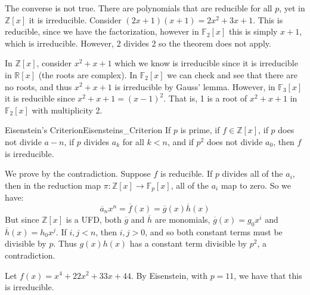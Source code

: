 \documentclass{article}                                                        %
\begin{document}
            \begin{example}
                The converse is not true. There are polynomials that are
                reducible for all $p$, yet in $\mathbb{Z}[x]$ it is irreducible.
                Consider $(2x+1)(x+1)=2x^{2}+3x+1$. This is reducible, since
                we have the factorization, however in $\mathbb{F}_{2}[x]$ this
                is simply $x+1$, which is irreducible. However, 2 divides 2 so
                the theorem does not apply.
            \end{example}
            \begin{example}
                In $\mathbb{Z}[x]$, consider $x^{2}+x+1$ which we know is
                irreducible since it is irreducible in $\mathbb{R}[x]$
                (the roots are complex). In $\mathbb{F}_{2}[x]$ we can check and
                see that there are no roots, and thus $x^{2}+x+1$ is irreducible
                by Gauss' lemma. However, in $\mathbb{F}_{3}[x]$ it is reducible
                since $x^{2}+x+1=(x-1)^{2}$. That is, 1 is a root of $x^{2}+x+1$
                in $\mathbb{F}_{2}[x]$ with multiplicity 2.
            \end{example}
            \begin{ftheorem}{Eisenstein's Criterion}{Eisensteins_Criterion}
                If $p$ is prime, if $f\in\mathbb{Z}[x]$, if $p$ does not divide
                $a-{n}$, if $p$ divides $a_{k}$ for all $k<n$, and if
                $p^{2}$ does not divide $a_{0}$, then $f$ is irreducible.
            \end{ftheorem}
            \begin{bproof}
                We prove by the contradiction. Suppose $f$ is reducible.
                If $p$ divides all of the $a_{i}$, then in the reduction map
                $\pi:\mathbb{Z}[x]\rightarrow\mathbb{F}_{p}[x]$, all of the
                $a_{i}$ map to zero. So we have:
                \begin{equation}
                    \overline{a}_{n}x^{n}=\overline{f}(x)
                    =\overline{g}(x)\overline{h}(x)
                \end{equation}
                But since $\mathbb{Z}[x]$ is a UFD, both $\overline{g}$ and
                $\overline{h}$ are monomials, $\overline{g}(x)=g_{0}x^{i}$ and
                $\overline{h}(x)=h_{0}x^{j}$. If $i,j<n$, then $i,j>0$, and so
                both constant terms must be divisible by $p$. Thus
                $g(x)h(x)$ has a constant term divisible by $p^{2}$, a
                contradiction.
            \end{bproof}
            \begin{example}
                Let $f(x)=x^{4}+22x^{2}+33x+44$. By Eisenstein, with $p=11$, we
                have that this is irreducible.
            \end{example}
\end{document}
